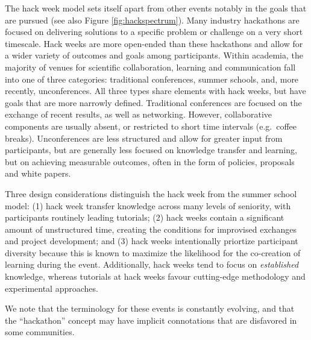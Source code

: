 \begin{bf}
The hack week model sets itself apart from other events notably in the goals that are pursued (see also Figure \ref{fig:hackspectrum}). 
Many industry hackathons are focused on delivering solutions to a specific problem or challenge on a very short timescale. 
Hack weeks are  more open-ended than these hackathons and allow for a wider variety of outcomes and goals among participants. Within academia, the majority of venues for scientific collaboration, learning and communication fall into one of three categories: traditional conferences, summer schools, and, more recently, unconferences. All three types share elements with hack weeks, but have goals that are more narrowly defined. 
Traditional conferences are focused on the exchange of recent results, as well as networking. However, collaborative components are usually absent, or restricted to short time intervals (e.g.\ coffee breaks). Unconferences are less structured and allow for greater input from participants, but are generally less focused on knowledge transfer and learning, but on achieving measurable outcomes, often in the form of policies, proposals and white papers. 

Three design considerations distinguish the hack week from the summer school model: (1) hack week transfer knowledge across many levels of seniority, with participants routinely leading tutorials; (2) hack weeks contain a significant amount of unstructured time, creating the conditions for improvised exchanges and project development; and (3) hack weeks intentionally priortize participant diversity because this is known to maximize the likelihood for the co-creation of learning during the event.  Additionally, hack weeks tend to focus on \textit{established} knowledge, whereas tutorials at hack weeks favour cutting-edge methodology and experimental approaches.
\end{bf}

We note that the terminology for these events is constantly evolving, and that the ``hackathon'' concept may have implicit connotations that are disfavored in some communities.

